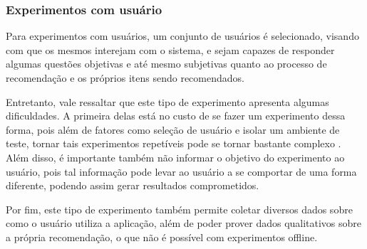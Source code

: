 \subsubsection{Experimentos com usuário}

Para experimentos com usuários, um conjunto de usuários é selecionado, visando
com que os mesmos interejam com o sistema, e sejam capazes de responder algumas
questões objetivas e até mesmo subjetivas quanto ao processo de recomendação e
os próprios itens sendo recomendados.

Entretanto, vale ressaltar que este tipo de experimento apresenta algumas
dificuldades. A primeira delas está no custo de se fazer um experimento dessa
forma, pois além de fatores como seleção de usuário e isolar um ambiente de
teste, tornar tais experimentos repetíveis pode se tornar bastante complexo
\cite{shani2011evaluating}. Além disso, é importante também não informar o
objetivo do experimento ao usuário, pois tal informação pode levar ao usuário a
se comportar de uma forma diferente, podendo assim gerar resultados
comprometidos.

Por fim, este tipo de experimento também permite coletar diversos dados sobre
como o usuário utiliza a aplicação, além de poder prover dados qualitativos
sobre a própria recomendação, o que não é possível com experimentos offline.
